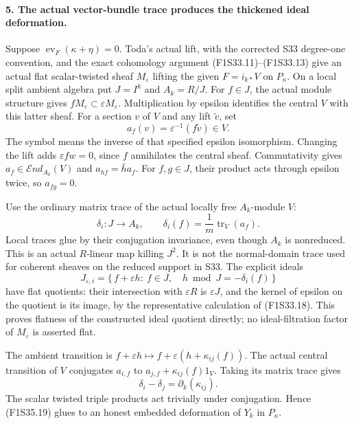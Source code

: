 \paragraph{5. The actual vector-bundle trace produces the thickened ideal deformation.}
Suppose
$\operatorname{ev}_F(\kappa+\eta)=0$.
Toda's actual lift, with the corrected S33
degree-one convention, and the exact
cohomology argument (F1S33.11)--(F1S33.13)
give an actual flat scalar-twisted sheaf
$M_\varepsilon$ lifting the given
$F=i_{k*}V$ on $P_\kappa$.
On a local split ambient algebra put
$J=I^k$ and $A_k=R/J$.
For $f\in J$, the actual module structure gives
$fM_\varepsilon\subset\varepsilon M_\varepsilon$.
Multiplication by epsilon identifies the
central $V$ with this latter sheaf.
For a section $v$ of $V$ and any lift
$\widetilde v$, set
\[
 a_f(v)=\varepsilon^{-1}(f\widetilde v)
                    \in V.
 \tag{F1S35.17}
\]
The symbol means the inverse of that specified
epsilon isomorphism. Changing the lift adds
$\varepsilon f w=0$, since $f$ annihilates
the central sheaf.
Commutativity gives
$a_f\in\mathcal End_{A_k}(V)$ and
$a_{hf}=\bar h a_f$.
For $f,g\in J$, their product acts through
epsilon twice, so $a_{fg}=0$.

Use the ordinary matrix trace of the actual
locally free $A_k$-module $V$:
\[
 \delta_i:J\longrightarrow A_k,\qquad
             \delta_i(f)=\frac1m\operatorname{tr}_V(a_f).
 \tag{F1S35.18}
\]
Local traces glue by their conjugation
invariance, even though $A_k$ is nonreduced.
This is an actual $R$-linear map killing
$J^2$. It is not the normal-domain trace
used for coherent sheaves on the reduced
support in S33.
The explicit ideals
\[
 J_{\varepsilon,i}
  =\{\,f+\varepsilon h:\ f\in J,\quad
                              h\bmod J=-\delta_i(f)\,\}
 \tag{F1S35.19}
\]
have flat quotients: their intersection with
$\varepsilon R$ is $\varepsilon J$, and
the kernel of epsilon on the quotient is
its image, by the representative calculation
of (F1S33.18).
This proves flatness of the constructed
ideal quotient directly; no ideal-filtration
factor of $M_\varepsilon$ is asserted flat.

The ambient transition is
$f+\varepsilon h\mapsto
 f+\varepsilon(h+\kappa_{ij}(f))$.
The actual central transition of $V$
conjugates $a_{i,f}$ to
$a_{j,f}+\kappa_{ij}(f)1_V$.
Taking its matrix trace gives
\[
              \delta_i-\delta_j
                             =\partial_k(\kappa_{ij}).
 \tag{F1S35.20}
\]
The scalar twisted triple products act
trivially under conjugation. Hence
(F1S35.19) glues to an honest embedded
deformation of $Y_k$ in $P_\kappa$.

